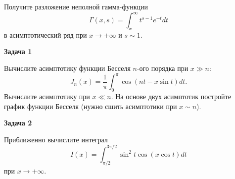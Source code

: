 \documentclass[a4paper,12pt]{article}
\begin{document}
\noindent Получите разложение неполной гамма-функции
$$
\Gamma(x,s)	=\int_{x}^{\infty}t^{s-1}e^{-t}dt
$$
\noindent в асимптотический ряд при $x\rightarrow+\infty$ и $s\sim 1$.

\vspace{15pt}
\noindent \textbf{Задача 1}

\noindent Вычислите асимптотику функции Бесселя $n$-ого порядка при $x\gg n$:
$$
J_{n}(x)	=\frac{1}{\pi}\int_{0}^{\pi}\cos(nt-x\sin t)dt.
$$
\noindent Вычислите асимптотику при $x\ll n$. На основе двух асимптотик постройте график функции Бесселя (нужно сшить асимптотики при $x\sim n$).

\vspace{15pt}
\noindent \textbf{Задача 2}

\noindent Приближенно вычислите интеграл
$$
I(x)	=\int_{\pi/2}^{3\pi/2}\sin^{2}t\cos(x\cos t)dt
$$
\noindent при $x\rightarrow+\infty$.
\end{document}
